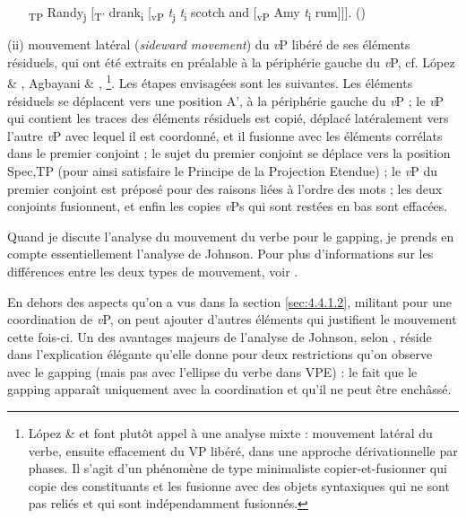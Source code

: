 \begin{enumerate}
\item [\textsubscript{TP} Randy\textsubscript{j} [\textsubscript{T'} drank\textsubscript{i} [\textsubscript{vP} \textit{t}\textsubscript{j}\textit{ t}\textsubscript{i} scotch] and [\textsubscript{vP} Amy \textit{t}\textsubscript{i} rum]]].      (\citet{Johnson2009})~  


\end{enumerate}
(ii) mouvement latéral (\textit{sideward movement}) du \textit{v}P libéré de ses éléments résiduels, qui ont été extraits en préalable à la périphérie gauche du \textit{v}P, cf. López \& \citet{Winkler2003}, Agbayani \& \citet{Zoerner2004}, \citet{Winkler2005}\footnote{López \& \citet{Winkler2003} et \citet{Winkler2005} font plutôt appel à une analyse mixte : mouvement latéral du verbe, ensuite effacement du VP libéré, dans une approche dérivationnelle par phases. Il s'agit d'un phénomène de type minimaliste copier-et-fusionner qui copie des constituants et les fusionne avec des objets syntaxiques qui ne sont pas reliés et qui sont indépendamment fusionnés.}. Les étapes envisagées sont les suivantes. Les éléments résiduels se déplacent vers une position A', à la périphérie gauche du \textit{v}P ; le \textit{v}P qui contient les traces des éléments résiduels est copié, déplacé latéralement vers l'autre \textit{v}P avec lequel il est coordonné, et il fusionne avec les éléments corrélats dans le premier conjoint ; le sujet du premier conjoint se déplace vers la position Spec,TP (pour ainsi satisfaire le Principe de la Projection Etendue) ; le \textit{v}P du premier conjoint est préposé pour des raisons liées à l'ordre des mots ; les deux conjoints fusionnent, et enfin les copies \textit{v}Ps qui sont restées en bas sont effacées. 

Quand je discute l'analyse du mouvement du verbe pour le gapping, je prends en compte essentiellement l'analyse de Johnson. Pour plus d'informations sur les différences entre les deux types de mouvement, voir \citet{Winkler2005}.

En dehors des aspects qu'on a vus dans la section \ref{sec:4.4.1.2}, militant pour une coordination de \textit{v}P, on peut ajouter d'autres éléments qui justifient le mouvement cette fois-ci. Un des avantages majeurs de l'analyse de Johnson, selon \citet{Vicente2010}, réside dans l'explication élégante qu'elle donne pour deux restrictions qu'on observe avec le gapping (mais pas avec l'ellipse du verbe dans VPE) : le fait que le gapping apparaît uniquement avec la coordination et qu'il ne peut être enchâssé.  

